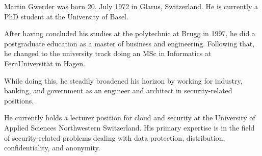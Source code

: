 
Martin Gwerder was born 20. July 1972 in Glarus, Switzerland. He is currently a PhD student at the University of Basel. 

After having concluded his studies at the polytechnic at Brugg in 1997, he did a postgraduate education as a master of business and engineering. Following that, he changed to the university track doing an MSc in Informatics at FernUniversit\"at in Hagen. 

While doing this, he steadily broadened his horizon by working for industry, banking, and government as an engineer and architect in security-related positions. 

He currently holds a lecturer position for cloud and security at the University of Applied Sciences Northwestern Switzerland. His primary expertise is in the field of security-related problems dealing with data protection, distribution, confidentiality, and anonymity. 